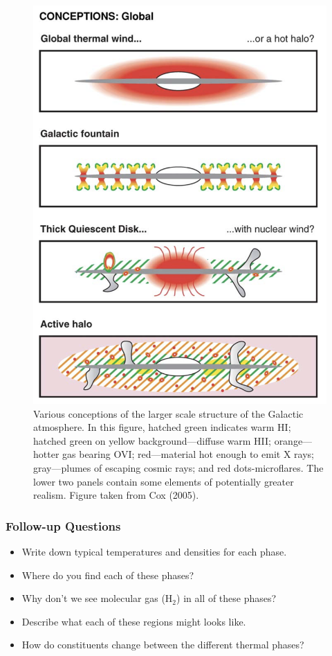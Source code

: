 \documentclass[a4paper,10pt]{article}
\begin{document}
\begin{figure}[t!]
    \centering
    \includegraphics[width=14cm]{figures/ISM_global.png}
    \caption{\footnotesize{Various conceptions of the larger scale structure of the Galactic atmosphere. In this figure, hatched green indicates warm HI; hatched green on yellow background—diffuse warm HII; orange—hotter gas bearing OVI; red—material hot enough to emit X rays; gray—plumes of escaping cosmic rays; and red dots-microflares. The lower two panels contain some elements of potentially greater realism. Figure taken from Cox (2005).}}
    \label{fig:ISMdisk}
\end{figure}

\newpage
\subsubsection{Follow-up Questions}

\begin{itemize}
    \item Write down typical temperatures and densities for each phase.
    \item Where do you find each of these phases?
    \item Why don't we see molecular gas (H$_2$) in all of these phases?
    \item Describe what each of these regions might looks like.
    \item How do constituents change between the different thermal phases?
\end{itemize}
\end{document}
